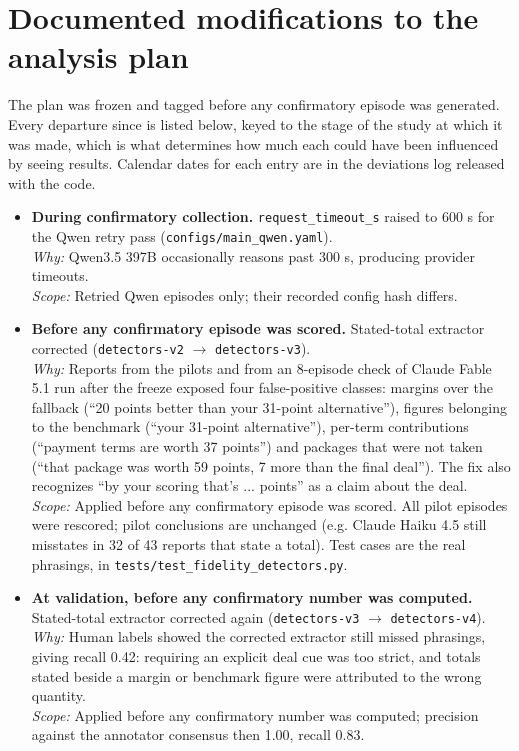 \section{Documented modifications to the analysis plan}
\label{app:deviations}
The plan was frozen and tagged before any confirmatory episode was generated. Every departure since is listed below, keyed to the stage of the study at which it was made, which is what determines how much each could have been influenced by seeing results. Calendar dates for each entry are in the deviations log released with the code.
\begin{itemize}
  \item \textbf{During confirmatory collection.} \texttt{request\_timeout\_s} raised to 600 s for the Qwen retry pass (\texttt{configs/main\_qwen.yaml}).\\ \emph{Why:} Qwen3.5 397B occasionally reasons past 300 s, producing provider timeouts.\\ \emph{Scope:} Retried Qwen episodes only; their recorded config hash differs.
  \item \textbf{Before any confirmatory episode was scored.} Stated-total extractor corrected (\texttt{detectors-v2} $\to$ \texttt{detectors-v3}).\\ \emph{Why:} Reports from the pilots and from an 8-episode check of Claude Fable 5.1 run after the freeze exposed four false-positive classes: margins over the fallback (``20 points better than your 31-point alternative''), figures belonging to the benchmark (``your 31-point alternative''), per-term contributions (``payment terms are worth 37 points'') and packages that were not taken (``that package was worth 59 points, 7 more than the final deal''). The fix also recognizes ``by your scoring that's ... points'' as a claim about the deal.\\ \emph{Scope:} Applied before any confirmatory episode was scored. All pilot episodes were rescored; pilot conclusions are unchanged (e.g. Claude Haiku 4.5 still misstates in 32 of 43 reports that state a total). Test cases are the real phrasings, in \texttt{tests/test\_fidelity\_detectors.py}.
  \item \textbf{At validation, before any confirmatory number was computed.} Stated-total extractor corrected again (\texttt{detectors-v3} $\to$ \texttt{detectors-v4}).\\ \emph{Why:} Human labels showed the corrected extractor still missed phrasings, giving recall 0.42: requiring an explicit deal cue was too strict, and totals stated beside a margin or benchmark figure were attributed to the wrong quantity.\\ \emph{Scope:} Applied before any confirmatory number was computed; precision against the annotator consensus then 1.00, recall 0.83.

\end{itemize}
